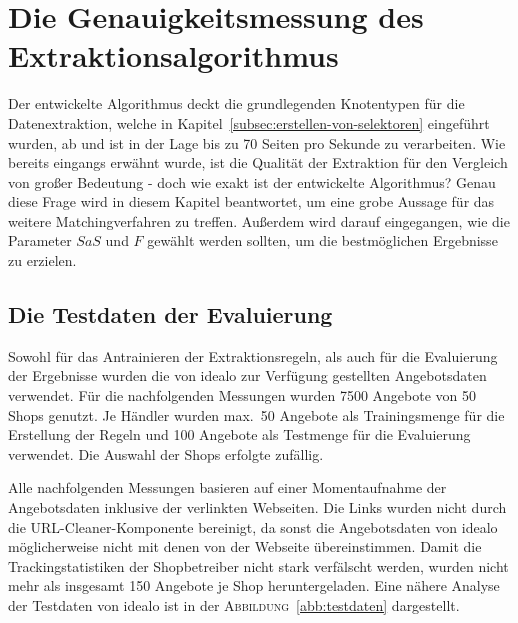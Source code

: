 \section{Die Genauigkeitsmessung des Extraktionsalgorithmus}
\label{sec:evaluierung}

Der entwickelte Algorithmus deckt die grundlegenden Knotentypen für die Datenextraktion, welche in
Kapitel~\ref{subsec:erstellen-von-selektoren} eingeführt wurden, ab und ist in der Lage bis zu 70 Seiten pro Sekunde
zu verarbeiten.
Wie bereits eingangs erwähnt wurde, ist die Qualität der Extraktion für den Vergleich von großer Bedeutung - doch wie
exakt ist der entwickelte Algorithmus?
Genau diese Frage wird in diesem Kapitel beantwortet, um eine grobe Aussage für das weitere Matchingverfahren zu
treffen.
Außerdem wird darauf eingegangen, wie die Parameter $SaS$ und $F$ gewählt werden sollten, um die bestmöglichen
Ergebnisse zu erzielen.

\subsection{Die Testdaten der Evaluierung}
\label{subsec:testdaten}
Sowohl für das Antrainieren der Extraktionsregeln, als auch für die Evaluierung der Ergebnisse wurden die von idealo
zur Verfügung gestellten Angebotsdaten verwendet.
Für die nachfolgenden Messungen wurden 7500 Angebote von 50 Shops genutzt.
Je Händler wurden max.\ 50 Angebote als Trainingsmenge für die Erstellung der Regeln und 100 Angebote als Testmenge für
die Evaluierung verwendet.
Die Auswahl der Shops erfolgte zufällig.

Alle nachfolgenden Messungen basieren auf einer Momentaufnahme der Angebotsdaten inklusive der verlinkten Webseiten.
Die Links wurden nicht durch die URL-Cleaner-Kom\-po\-nen\-te bereinigt, da sonst die Angebotsdaten von idealo
möglicherweise nicht mit denen von der Webseite übereinstimmen.
Damit die Trackingstatistiken der Shopbetreiber nicht stark verfälscht werden, wurden nicht mehr als insgesamt 150
Angebote je Shop heruntergeladen.
Eine nähere Analyse der Testdaten von idealo ist in der \textsc{Abbildung}~\ref{abb:testdaten} dargestellt.

